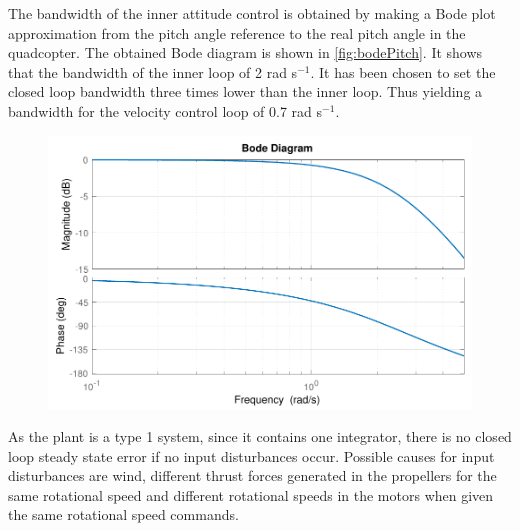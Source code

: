 The bandwidth of the inner attitude control is obtained by making a Bode plot approximation from the pitch angle reference to the real pitch angle in the quadcopter. The obtained Bode diagram is shown in \autoref{fig:bodePitch}. It shows that the bandwidth of the inner loop of 2 rad s$^{-1}$. It has been chosen to set the closed loop bandwidth three times lower than the inner loop. Thus yielding a bandwidth for the velocity control loop of 0.7 rad s$^{-1}$.
%
\begin{figure}[H]
    \includegraphics[scale=.8]{figures/bodePitch}
    \centering			
    \label{fig:bodePitch}
\end{figure} 
%
%
%
As the plant is a type 1 system, since it contains one integrator, there is no closed loop steady state error if no input disturbances occur. Possible causes for input disturbances are wind, different thrust forces generated in the propellers for the same rotational speed and different rotational speeds in the motors when given the same rotational speed commands.

